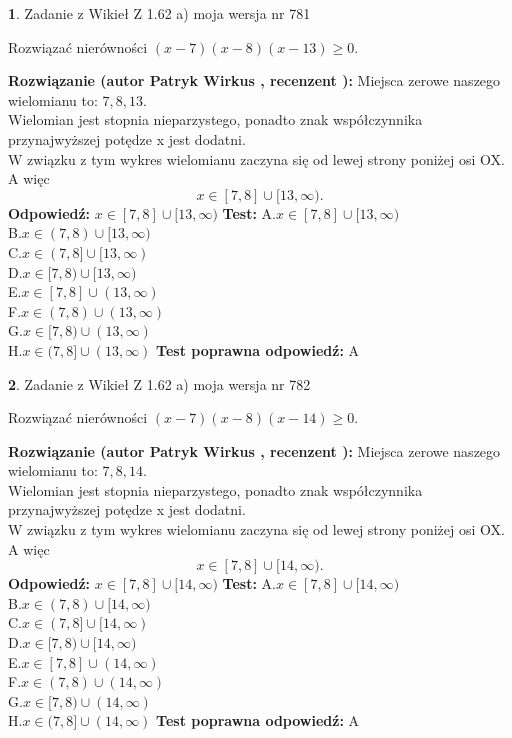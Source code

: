 \documentclass[12pt, a4paper]{article}
\theoremstyle{definition} %
\newtheorem{zad}{}
\newcommand{\zadStart}[1]{\begin{zad}#1\newline}
\newcommand{\zadStop}{\end{zad}}
\newcommand{\rozwStart}[2]{\noindent \textbf{Rozwiązanie (autor #1 , recenzent #2): }\newline}
\newcommand{\rozwStop}{\newline}
\newcommand{\odpStart}{\noindent \textbf{Odpowiedź:}\newline}
\newcommand{\odpStop}{\newline}
\newcommand{\testStart}{\noindent \textbf{Test:}\newline}
\newcommand{\testStop}{\newline}
\newcommand{\kluczStart}{\noindent \textbf{Test poprawna odpowiedź:}\newline}
\newcommand{\kluczStop}{\newline}
\begin{document}
\zadStart{Zadanie z Wikieł Z 1.62 a) moja wersja nr 781}

Rozwiązać nierówności $(x-7)(x-8)(x-13)\ge0$.
\zadStop
\rozwStart{Patryk Wirkus}{}
Miejsca zerowe naszego wielomianu to: $7, 8, 13$.\\
Wielomian jest stopnia nieparzystego, ponadto znak współczynnika przy\linebreak najwyższej potędze x jest dodatni.\\ W związku z tym wykres wielomianu zaczyna się od lewej strony poniżej osi OX. A więc $$x \in [7,8] \cup [13,\infty).$$
\rozwStop
\odpStart
$x \in [7,8] \cup [13,\infty)$
\odpStop
\testStart
A.$x \in [7,8] \cup [13,\infty)$\\
B.$x \in (7,8) \cup [13,\infty)$\\
C.$x \in (7,8] \cup [13,\infty)$\\
D.$x \in [7,8) \cup [13,\infty)$\\
E.$x \in [7,8] \cup (13,\infty)$\\
F.$x \in (7,8) \cup (13,\infty)$\\
G.$x \in [7,8) \cup (13,\infty)$\\
H.$x \in (7,8] \cup (13,\infty)$
\testStop
\kluczStart
A
\kluczStop



\zadStart{Zadanie z Wikieł Z 1.62 a) moja wersja nr 782}

Rozwiązać nierówności $(x-7)(x-8)(x-14)\ge0$.
\zadStop
\rozwStart{Patryk Wirkus}{}
Miejsca zerowe naszego wielomianu to: $7, 8, 14$.\\
Wielomian jest stopnia nieparzystego, ponadto znak współczynnika przy\linebreak najwyższej potędze x jest dodatni.\\ W związku z tym wykres wielomianu zaczyna się od lewej strony poniżej osi OX. A więc $$x \in [7,8] \cup [14,\infty).$$
\rozwStop
\odpStart
$x \in [7,8] \cup [14,\infty)$
\odpStop
\testStart
A.$x \in [7,8] \cup [14,\infty)$\\
B.$x \in (7,8) \cup [14,\infty)$\\
C.$x \in (7,8] \cup [14,\infty)$\\
D.$x \in [7,8) \cup [14,\infty)$\\
E.$x \in [7,8] \cup (14,\infty)$\\
F.$x \in (7,8) \cup (14,\infty)$\\
G.$x \in [7,8) \cup (14,\infty)$\\
H.$x \in (7,8] \cup (14,\infty)$
\testStop
\kluczStart
A
\kluczStop
\end{document}

